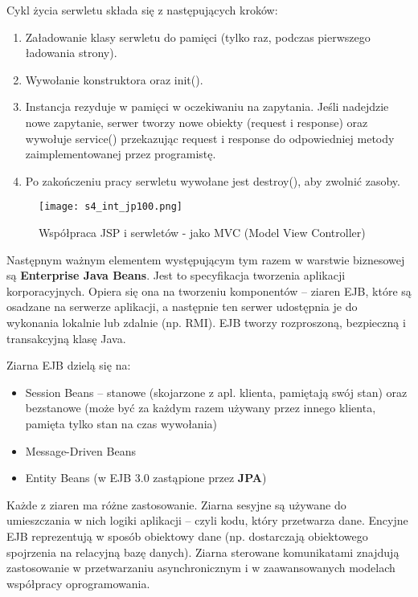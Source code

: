 Cykl życia serwletu składa się z następujących kroków:
\begin{enumerate}
    \item Załadowanie klasy serwletu do pamięci (tylko raz, podczas pierwszego ładowania strony).
    \item Wywołanie konstruktora oraz init().
    \item Instancja rezyduje w pamięci w oczekiwaniu na zapytania. Jeśli nadejdzie nowe zapytanie, serwer tworzy nowe obiekty (request i response) oraz wywołuje service() przekazując request i response do odpowiedniej metody zaimplementowanej przez programistę.
    \item Po zakończeniu pracy serwletu wywołane jest destroy(), aby zwolnić zasoby. 
\end{enumerate}

\begin{figure}[H]
\centering
\texttt{[image: s4\_int\_jp100.png]}
\caption{Współpraca JSP i serwletów - jako MVC (Model View Controller)}
\end{figure}

Następnym ważnym elementem występującym tym razem w warstwie biznesowej są \textbf{Enterprise Java Beans}. Jest to specyfikacja tworzenia aplikacji korporacyjnych. Opiera się ona na tworzeniu komponentów -- ziaren EJB, które są osadzane na serwerze aplikacji, a następnie ten serwer udostępnia je do wykonania lokalnie lub zdalnie (np. RMI). EJB tworzy rozproszoną, bezpieczną i transakcyjną klasę Java.

Ziarna EJB dzielą się na:
\begin{itemize}
    \item Session Beans -- stanowe (skojarzone z apl. klienta, pamiętają swój stan) oraz bezstanowe (może być za każdym razem używany przez innego klienta, pamięta tylko stan na czas wywołania)
    \item Message-Driven Beans
    \item Entity Beans (w EJB 3.0 zastąpione przez \textbf{JPA})
\end{itemize}

Każde z ziaren ma różne zastosowanie. Ziarna sesyjne są używane do umieszczania w nich logiki aplikacji -- czyli kodu, który przetwarza dane. Encyjne EJB reprezentują w sposób obiektowy dane (np. dostarczają obiektowego spojrzenia na relacyjną bazę danych). Ziarna sterowane komunikatami znajdują zastosowanie w przetwarzaniu asynchronicznym i w zaawansowanych modelach współpracy oprogramowania.

